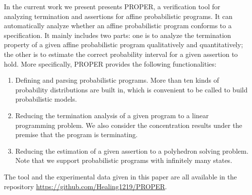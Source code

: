 \documentclass[sigconf,review, anonymous]{acmart}
\begin{document}
In the current work we present presents PROPER, a verification tool for analyzing termination and assertions for affine probabilistic programs. It can automatically analyze whether an affine  probabilistic program conforms to a specification.
It mainly includes two parts: one is to analyze the termination property of a given affine probabilistic program qualitatively and quantitatively; the other is to estimate the correct probability interval for a given assertion to hold.
More specifically, PROPER provides the following functionalities:
\begin{enumerate}
	\item Defining and parsing probabilistic programs. More than ten kinds of probability distributions are built in, which is convenient to be called to build probabilistic models.
    \item Reducing the termination analysis of a given program to a linear programming problem. We also consider the concentration results under the premise that the program is terminating.
	\item Reducing the estimation of a given assertion to a polyhedron solving problem. Note that we support probabilistic programs with infinitely many states.	
\end{enumerate}
The tool and the experimental data given in this paper are all available in the repository \url{https://github.com/Healing1219/PROPER}.
\end{document}
